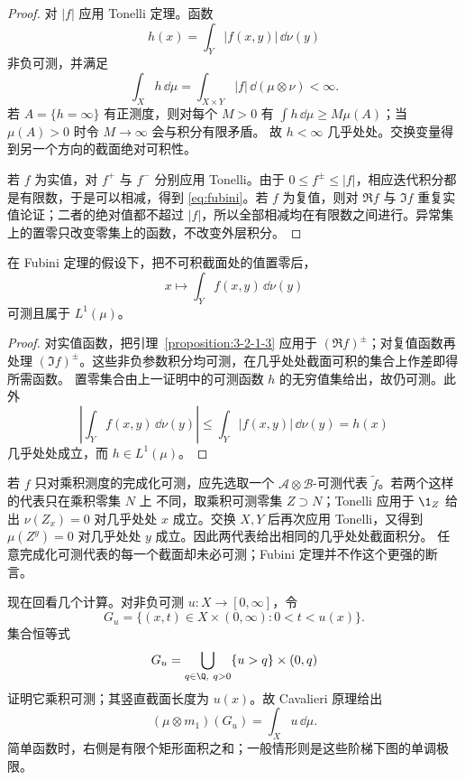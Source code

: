 \begin{proof}
对 $|f|$ 应用 Tonelli 定理。函数
\[
 h(x)=\int_Y|f(x,y)|\,\dd\nu(y)
\]
非负可测，并满足
\[
 \int_Xh\,\dd\mu=\int_{X\times Y}|f|\,\dd(\mu\otimes\nu)<\infty.
\]
若 $A=\{h=\infty\}$ 有正测度，则对每个 $M>0$ 有
$\int h\,\dd\mu\ge M\mu(A)$；当 $\mu(A)>0$ 时令 $M\to\infty$ 会与积分有限矛盾。
故 $h<\infty$ 几乎处处。交换变量得到另一个方向的截面绝对可积性。

若 $f$ 为实值，对 $f^+$ 与 $f^-$ 分别应用 Tonelli。由于
$0\le f^\pm\le|f|$，相应迭代积分都是有限数，于是可以相减，得到
\eqref{eq:fubini}。若 $f$ 为复值，则对 $\Re f$ 与 $\Im f$ 重复实值论证；二者的绝对值都不超过
$|f|$，所以全部相减均在有限数之间进行。异常集上的置零只改变零集上的函数，不改变外层积分。
\end{proof}

\begin{corollary}[可积参数积分的可测性]\label{corollary:3-2-1-integrable-parameter}
在 Fubini 定理的假设下，把不可积截面处的值置零后，
\[
 x\longmapsto\int_Yf(x,y)\,\dd\nu(y)
\]
可测且属于 $L^1(\mu)$。
\end{corollary}

\begin{proof}
对实值函数，把引理~\ref{proposition:3-2-1-3} 应用于 $(\Re f)^\pm$；对复值函数再处理
$(\Im f)^\pm$。这些非负参数积分均可测，在几乎处处截面可积的集合上作差即得所需函数。
置零集合由上一证明中的可测函数 $h$ 的无穷值集给出，故仍可测。此外
\[
 \left|\int_Yf(x,y)\,\dd\nu(y)\right|
 \le \int_Y|f(x,y)|\,\dd\nu(y)=h(x)
\]
几乎处处成立，而 $h\in L^1(\mu)$。
\end{proof}

\begin{remark}[完成化上的代表]
若 $f$ 只对乘积测度的完成化可测，应先选取一个
$\mathcal A\otimes\mathcal B$-可测代表 $\widetilde f$。若两个这样的代表只在乘积零集 $N$ 上
不同，取乘积可测零集 $Z\supset N$；Tonelli 应用于 $\1_Z$ 给出
$\nu(Z_x)=0$ 对几乎处处 $x$ 成立。交换 $X,Y$ 后再次应用 Tonelli，又得到
$\mu(Z^y)=0$ 对几乎处处 $y$ 成立。因此两代表给出相同的几乎处处截面积分。
任意完成化可测代表的每一个截面却未必可测；Fubini 定理并不作这个更强的断言。
\end{remark}

现在回看几个计算。对非负可测 $u:X\to[0,\infty]$，令
\[
 G_u=\{(x,t)\in X\times(0,\infty):0<t<u(x)\}.
\]
集合恒等式
\[
 G_u=\bigcup_{q\in\Q,\ q>0}\{u>q\}\times(0,q)
\]
证明它乘积可测；其竖直截面长度为 $u(x)$。故 Cavalieri 原理给出
\[
 (\mu\otimes m_1)(G_u)=\int_Xu\,\dd\mu.
 \tag{3.2.5}\label{eq:subgraph-area}
\]
简单函数时，右侧是有限个矩形面积之和；一般情形则是这些阶梯下图的单调极限。

